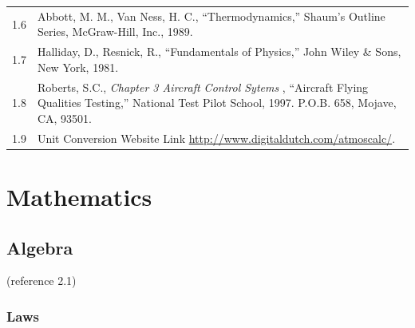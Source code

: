 \documentclass[
]{book}
\begin{document}
\begin{longtable}[]{@{}ll@{}}
\begin{minipage}[t]{0.06\columnwidth}\raggedright
1.6\strut
\end{minipage} & \begin{minipage}[t]{0.88\columnwidth}\raggedright
Abbott, M. M., Van Ness, H. C., ``Thermodynamics,'' Shaum's Outline Series, McGraw-Hill, Inc., 1989.\strut
\end{minipage}\tabularnewline
\begin{minipage}[t]{0.06\columnwidth}\raggedright
1.7\strut
\end{minipage} & \begin{minipage}[t]{0.88\columnwidth}\raggedright
Halliday, D., Resnick, R., ``Fundamentals of Physics,'' John Wiley \& Sons, New York, 1981.\strut
\end{minipage}\tabularnewline
\begin{minipage}[t]{0.06\columnwidth}\raggedright
1.8\strut
\end{minipage} & \begin{minipage}[t]{0.88\columnwidth}\raggedright
Roberts, S.C., \emph{Chapter 3 Aircraft Control Sytems} , ``Aircraft Flying Qualities Testing,'' National Test Pilot School, 1997. P.O.B. 658, Mojave, CA, 93501.\strut
\end{minipage}\tabularnewline
\begin{minipage}[t]{0.06\columnwidth}\raggedright
1.9\strut
\end{minipage} & \begin{minipage}[t]{0.88\columnwidth}\raggedright
Unit Conversion Website Link \url{http://www.digitaldutch.com/atmoscalc/}.\strut
\end{minipage}\tabularnewline
\bottomrule
\end{longtable}

\hypertarget{mathematics}{%
\chapter{Mathematics}\label{mathematics}}

\hypertarget{algebra}{%
\section{Algebra}\label{algebra}}

(reference 2.1)

\hypertarget{laws}{%
\subsection{Laws}\label{laws}}
\end{document}
